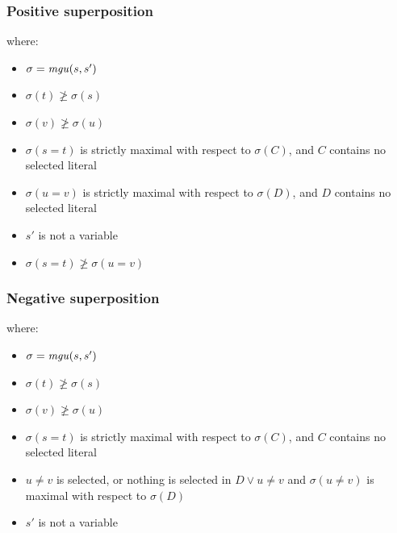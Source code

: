 \documentclass[a4paper]{beamer}
\begin{document}
\begin{frame}
\frametitle{Positive superposition}

where:

\begin{itemize}
\item $\sigma = \mathit{mgu}(s, s')$
\item $\sigma(t) \ngeq \sigma(s)$
\item $\sigma(v) \ngeq \sigma(u)$
\item $\sigma(s = t)$ is strictly maximal with respect to $\sigma(C)$, and $C$ contains no selected literal
\item $\sigma(u = v)$ is strictly maximal with respect to $\sigma(D)$, and $D$ contains no selected literal
\item $s'$ is not a variable
\item $\sigma(s = t) \ngeq \sigma(u = v)$
\end{itemize}
\end{frame}

\begin{frame}
\frametitle{Negative superposition}

where:

\begin{itemize}
\item $\sigma = \mathit{mgu}(s, s')$
\item $\sigma(t) \ngeq \sigma(s)$
\item $\sigma(v) \ngeq \sigma(u)$
\item $\sigma(s = t)$ is strictly maximal with respect to $\sigma(C)$, and $C$ contains no selected literal
\item $u \neq v$ is selected, or nothing is selected in $D \lor u \neq v$ and $\sigma(u \neq v)$ is maximal with respect to $\sigma(D)$
\item $s'$ is not a variable
\end{itemize}
\end{frame}
\end{document}

